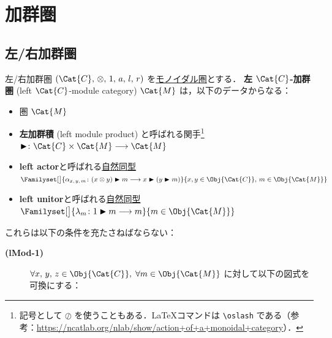 \documentclass[TQFT_main]{subfiles}
\begin{document}
\section{加群圏}

\subsection{左/右加群圏}

\begin{mydef}[label=def:modulecat,breakable]{左/右加群圏}
    $(\Cat{C},\, \otimes,\, 1,\, a,\, l,\, r)$ を\hyperref[redef:monoidal-category]{モノイダル圏}とする．
    \textbf{左 $\Cat{C}$-加群圏} (left $\Cat{C}$-module category) $\Cat{M}$ は，以下のデータからなる：
    \begin{itemize}
        \item 圏 $\Cat{M}$
        \item \textbf{左加群積} (left module product) と呼ばれる関手\footnote{記号として $\oslash$ を使うこともある．\LaTeX コマンドは \texttt{\textbackslash oslash} である（参考：\url{https://ncatlab.org/nlab/show/action+of+a+monoidal+category}）．} $\btr \colon \Cat{C} \times \Cat{M} \lto \Cat{M}$
        \item \textbf{left actor}と呼ばれる\hyperref[def:nat]{自然同型} $\Familyset[\big]{\alpha_{x,\, y,\, m} \colon (x \otimes y) \btr m \lto x \btr (y \btr m)}{x,y \in \Obj{\Cat{C}},\, m \in \Obj{\Cat{M}}}$
        \item \textbf{left unitor}と呼ばれる\hyperref[def:nat]{自然同型} $\Familyset[\big]{\lambda_{m} \colon 1 \btr m \lto m}{m \in \Obj{\Cat{M}}}$
    \end{itemize}
    これらは以下の条件を充たさねばならない：
    \begin{description}
        \item[\textbf{(lMod-1)}] $\forall x,\,y,\, z \in \Obj{\Cat{C}},\; \forall m \in \Obj{\Cat{M}}$ に対して以下の図式を可換にする：
        \begin{flushleft}
\end{flushleft}
\end{description}
\end{mydef}
\end{document}
